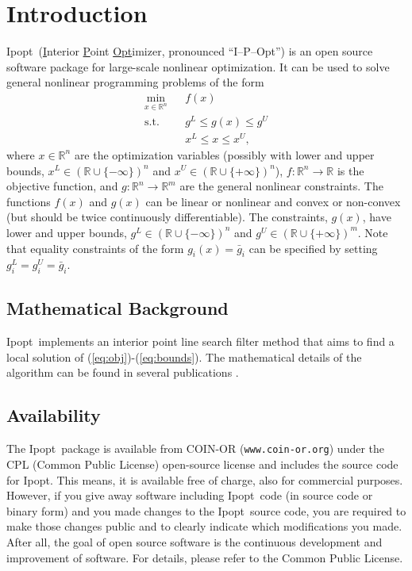 \documentclass[10pt]{article}
\newcommand{\RR}{{\mathbb{R}}}
\newcommand{\Ipopt}{{\sc Ipopt}}
\begin{document}
\section{Introduction}
\Ipopt\ (\underline{I}nterior \underline{P}oint \underline{Opt}imizer,
pronounced ``I--P--Opt'') is an open source software package for
large-scale nonlinear optimization. It can be used to solve general
nonlinear programming problems of the form
\begin{eqnarray}
\min_{x\in\RR^n} &&f(x) \label{eq:obj} \\
\mbox{s.t.} \;  &&g^L \leq g(x) \leq g^U \\
                &&x^L \leq x \leq x^U, \label{eq:bounds}
\end{eqnarray}
where $x \in \RR^n$ are the optimization variables (possibly with
lower and upper bounds, $x^L\in(\RR\cup\{-\infty\})^n$ and
$x^U\in(\RR\cup\{+\infty\})^n$), $f:\RR^n\longrightarrow\RR$ is the
objective function, and $g:\RR^n\longrightarrow \RR^m$ are the general
nonlinear constraints.  The functions $f(x)$ and $g(x)$ can be linear
or nonlinear and convex or non-convex (but should be twice
continuously differentiable). The constraints, $g(x)$, have lower and
upper bounds, $g^L\in(\RR\cup\{-\infty\})^n$ and
$g^U\in(\RR\cup\{+\infty\})^m$. Note that equality constraints of the
form $g_i(x)=\bar g_i$ can be specified by setting
$g^L_{i}=g^U_{i}=\bar g_i$.

\subsection{Mathematical Background}
\Ipopt\ implements an interior point line search filter method that
aims to find a local solution of (\ref{eq:obj})-(\ref{eq:bounds}).  The
mathematical details of the algorithm can be found in several
publications
\cite{NocWaeWal:adaptive,WaechterPhD,WaecBieg06:mp,WaeBie05:filterglobal,WaeBie05:filterlocal}.

\subsection{Availability}
The \Ipopt\ package is available from COIN-OR
(\texttt{www.coin-or.org}) under the CPL (Common Public License)
open-source license and includes the source code for \Ipopt.  This
means, it is available free of charge, also for commercial purposes.
However, if you give away software including \Ipopt\ code (in source
code or binary form) and you made changes to the \Ipopt\ source code,
you are required to make those changes public and to clearly indicate
which modifications you made.  After all, the goal of open source
software is the continuous development and improvement of software.
For details, please refer to the Common Public License.
\end{document}
